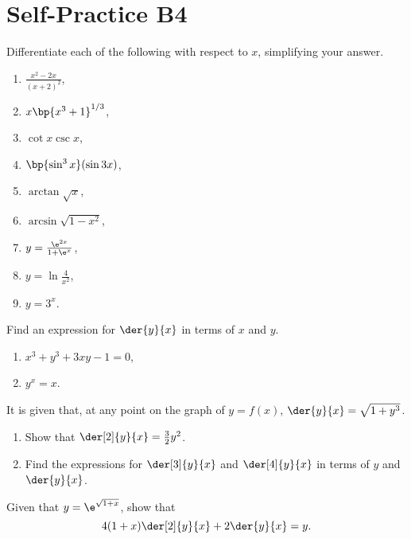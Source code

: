 \section{Self-Practice B4}

\begin{problem}
    Differentiate each of the following with respect to $x$, simplifying your answer.
    \begin{enumerate}
        \item $\frac{x^2 - 2x}{(x+2)^2}$,
        \item $x\bp{x^3 + 1}^{1/3}$,
        \item $\cot x \csc x$,
        \item $\bp{\sin^3 x} (\sin 3x)$,
        \item $\arctan \sqrt x$,
        \item $\arcsin \sqrt{1 - x^2}$,
        \item $y = \frac{\e^{2x}}{1 + \e^x}$,
        \item $y = \ln \frac4{x^2}$,
        \item $y = 3^x$.
    \end{enumerate}
\end{problem}

\begin{problem}
    Find an expression for $\der{y}{x}$ in terms of $x$ and $y$.
    \begin{enumerate}
        \item $x^3 + y^3 + 3xy -1 = 0$,
        \item $y^x = x$.
    \end{enumerate}
\end{problem}

\begin{problem}
    It is given that, at any point on the graph of $y = f(x)$, $\der{y}{x} = \sqrt{1 + y^3}$.
    \begin{enumerate}
        \item Show that $\der[2]{y}{x} = \frac32 y^2$.
        \item Find the expressions for $\der[3]{y}{x}$ and $\der[4]{y}{x}$ in terms of $y$ and $\der{y}{x}$.
    \end{enumerate}
\end{problem}

\begin{problem}
    Given that $y = \e^{\sqrt{1 + x}}$, show that \[4(1 + x) \der[2]{y}{x} + 2\der{y}{x} = y.\]
\end{problem}

